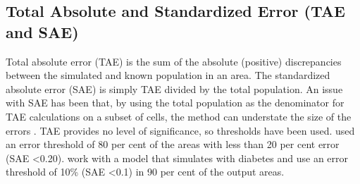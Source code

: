 \documentclass[a4paper,10pt]{article}
\begin{document}



\subsection{Total Absolute and Standardized Error (TAE and SAE)}
Total absolute error (TAE) is the sum of the absolute (positive)
discrepancies between the simulated
and known population in an area. The standardized absolute error (SAE) is
simply TAE divided by the total population. 
An issue with SAE has been that, by using the total population as the
denominator for TAE calculations on a subset of cells, the method
can understate the size of the errors \citep{Edwards2009}.
TAE provides no level of significance, so thresholds have been used.
\citet{clarke2001regional} used an error threshold of 80 per cent of the
areas with less than 20 per cent error (SAE \textless 0.20). %
\citet{smith2007simhealth} work with a model that simulates with diabetes and
use an error threshold of 10\% (SAE \textless 0.1)
in 90 per cent of the output areas. %
\end{document}
